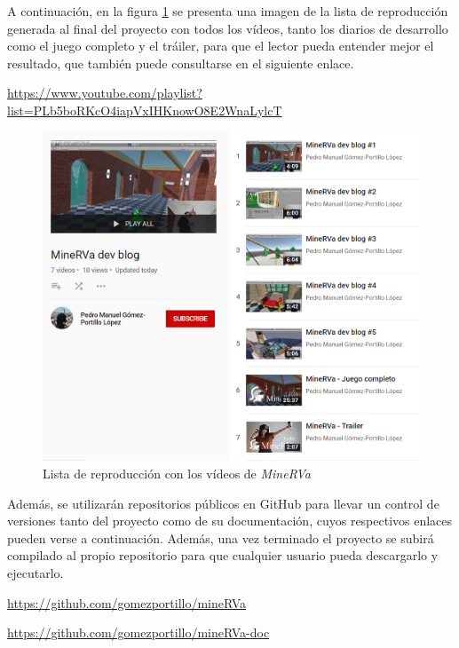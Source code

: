 A continuación,  en la figura \ref{fig:playlist} se presenta una imagen de la lista de reproducción generada al final del proyecto con todos los vídeos, tanto los diarios de desarrollo como el juego completo y el tráiler, para que el lector pueda entender mejor el resultado, que también puede consultarse en el siguiente enlace.

\begin{center}
    \url{https://www.youtube.com/playlist?list=PLb5boRKcO4iapVxIHKnowO8E2WnaLylcT}
\end{center}

\begin{figure}[!h]
\begin{center}
\includegraphics[width=1\textwidth]{imagenes/5/playlist.png}
\caption{Lista de reproducción con los vídeos de \textit{MineRVa}}
\label{fig:playlist}
\end{center}
\end{figure}

Además, se utilizarán repositorios públicos en GitHub para llevar un control de versiones tanto del proyecto como de su documentación, cuyos respectivos enlaces pueden verse a continuación. Además, una vez terminado el proyecto se subirá compilado al propio repositorio para que cualquier usuario pueda descargarlo y ejecutarlo.

\begin{center}
    \url{https://github.com/gomezportillo/mineRVa}
    
    \url{https://github.com/gomezportillo/mineRVa-doc}
\end{center}